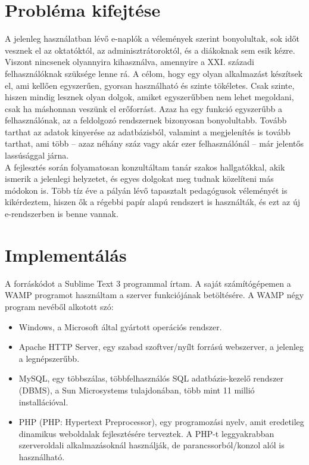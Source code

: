 \documentclass[
]{thesis-ekf}
\begin{document}
\chapter{Probléma kifejtése}
A jelenleg használatban lévő e-naplók a vélemények szerint bonyolultak, sok időt vesznek el az oktatóktól, az adminisztrátoroktól, és a diákoknak sem esik kézre. Viszont nincsenek olyannyira kihasználva, amennyire a XXI. századi felhasználóknak szüksége lenne rá. A célom, hogy egy olyan alkalmazást készítsek el, ami kellően egyszerűen, gyorsan használható és szinte tökéletes. Csak szinte, hiszen mindig lesznek olyan dolgok, amiket egyszerűbben nem lehet megoldani, csak ha máshonnan veszünk el erőforrást. Azaz ha egy funkció egyszerűbb a felhasználónak, az a feldolgozó rendszernek bizonyosan bonyolultabb. Tovább tarthat az adatok kinyerése az adatbázisból, valamint a megjelenítés is tovább tarthat, ami több -- azaz néhány száz vagy akár ezer felhasználónál -- már jelentős lassúsággal járna.\\
A fejlesztés során folyamatosan konzultáltam tanár szakos hallgatókkal, akik ismerik a jelenlegi helyzetet, és egyes dolgokat meg tudnak közelíteni más módokon is. Több tíz éve a pályán lévő tapasztalt pedagógusok véleményét is kikérdeztem, hiszen ők a régebbi papír alapú rendszert is használták, és ezt az új e-rendszerben is benne vannak.
\chapter{Implementálás}
A forráskódot a Sublime Text 3 programmal írtam. A saját számítógépemen a WAMP programot használtam a szerver funkciójának betöltésére.
A WAMP négy program nevéből alkotott szó:
\begin{itemize}
	\item Windows, a Microsoft által gyártott operációs rendszer.
	\item Apache HTTP Server, egy szabad szoftver/nyílt forrású webszerver, a jelenleg a legnépszerűbb.
	\item MySQL, egy többszálas, többfelhasználós SQL adatbázis-kezelő rendszer (DBMS), a Sun Microsystems tulajdonában, több mint 11 millió installációval.
	\item PHP (PHP: Hypertext Preprocessor), egy programozási nyelv, amit eredetileg dinamikus weboldalak fejlesztésére terveztek. A PHP-t leggyakrabban szerveroldali alkalmazásoknál használják, de parancssorból/konzol alól is használható.
\end{itemize}
\end{document}
